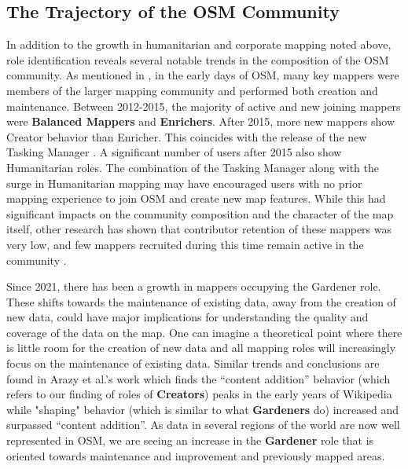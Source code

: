 \documentclass[manuscript,screen,review]{acmart}
\begin{document}
\subsection{The Trajectory of the OSM Community}

In addition to the growth in humanitarian and corporate mapping noted above, role identification reveals several notable trends in the composition of the OSM community. As mentioned in \cite{palen15}, in the early days of OSM, many key mappers were members of the larger mapping community and performed both creation and maintenance. Between 2012-2015, the majority of active and new joining mappers were \textbf{Balanced Mappers} and \textbf{Enrichers}. After 2015, more new mappers show Creator behavior than Enricher. This coincides with the release of the new Tasking Manager \cite{palen15,herfort2021evolution}. A significant number of users after 2015 also show Humanitarian roles. The combination of the Tasking Manager along with the surge in Humanitarian mapping may have encouraged users with no prior mapping experience to join OSM and create new map features. While this had significant impacts on the community composition and the character of the map itself, other research has shown that contributor retention of these mappers was very low, and few mappers recruited during this time remain active in the community \cite{Mahmud22}.

Since 2021, there has been a growth in mappers occupying the Gardener role. These shifts towards the maintenance of existing data, away from the creation of new data, could have major implications for understanding the quality and coverage of the data on the map. One can imagine a theoretical point where there is little room for the creation of new data and all mapping roles will increasingly focus on the maintenance of existing data. Similar trends and conclusions are found in Arazy et al.'s work\cite{Arazy20} which finds the “content addition” behavior (which refers to our finding of roles of \textbf{Creators}) peaks in the early years of Wikipedia while "shaping" behavior (which is similar to what \textbf{Gardeners} do) increased and surpassed “content addition”. As data in several regions of the world are now well represented in OSM\cite{herfort2021evolution}, we are seeing an increase in the \textbf{Gardener} role that is oriented towards maintenance and improvement and previously mapped areas. 
\end{document}
